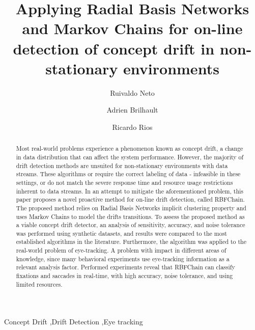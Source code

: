 \documentclass[preprint,12pt]{elsarticle}
\begin{document}
\begin{frontmatter}


\title{Applying Radial Basis Networks and Markov Chains for on-line detection of concept drift in non-stationary environments}




\author{Ruivaldo Neto}
\author{Adrien Brilhault}
\author{Ricardo Rios}

\address{Salvador, Brazil}

\begin{abstract}
Most real-world problems experience a phenomenon known as concept drift,
a change in data distribution that can affect the system performance.
%
However, the majority of drift detection methods are unsuited for non-stationary environments with data streams.
These algorithms or require the correct labeling of data - infeasible in these settings,
or do not match the severe response time and resource usage restrictions inherent to data streams.
%
In an attempt to mitigate the aforementioned problem,
this paper proposes a novel proactive method for on-line drift detection,
called RBFChain.
The proposed method relies on Radial Basis Networks implicit clustering property
and uses Markov Chains to model the drifts transitions.
%
To assess the proposed method as a viable concept drift detector,
an analysis of sensitivity, accuracy,
and noise tolerance was performed using synthetic datasets,
and results were compared to the most established algorithms in the literature.
%
Furthermore, the algorithm was applied to the real-world problem of eye-tracking.
A problem with impact in different areas of knowledge,
since many behavioral experiments use eye-tracking information as a relevant analysis factor.
Performed experiments reveal that RBFChain can classify fixations and saccades in real-time, with high accuracy, noise tolerance, and using limited resources.
\end{abstract}

\begin{keyword}
Concept Drift \sep Drift Detection \sep Eye tracking
\end{keyword}

\end{frontmatter}
\end{document}

